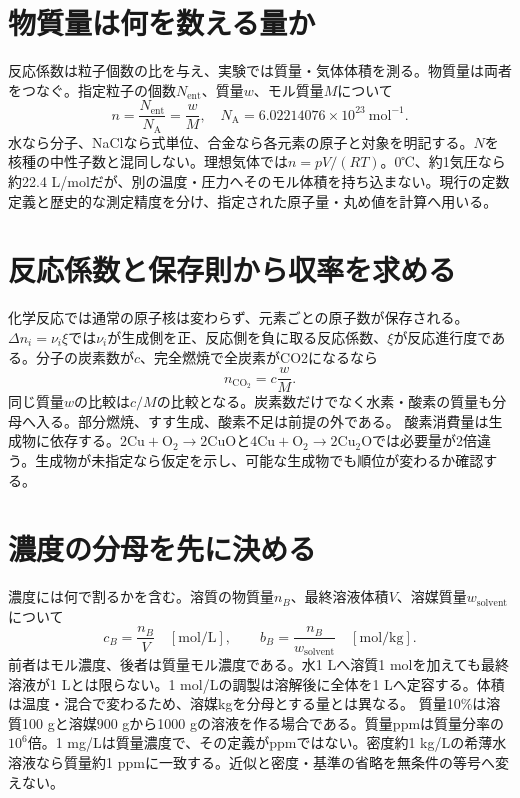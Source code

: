 \section{物質量は何を数える量か}
\label{theory:basicchem:amount}
反応係数は粒子個数の比を与え、実験では質量・気体体積を測る。物質量は両者をつなぐ。指定粒子の個数\(N_{\mathrm{ent}}\)、質量\(w\)、モル質量\(M\)について
\begin{equation}n=\frac{N_{\mathrm{ent}}}{N_{\mathrm A}}=\frac{w}{M},\quad N_{\mathrm A}=6.02214076\times10^{23}\ \mathrm{mol^{-1}}.\end{equation}
水なら分子、NaClなら式単位、合金なら各元素の原子と対象を明記する。\(N\)を核種の中性子数と混同しない。理想気体では\(n=pV/(RT)\)。0℃、約1気圧なら約22.4 L/molだが、別の温度・圧力へそのモル体積を持ち込まない。現行の定数定義と歴史的な測定精度を分け、指定された原子量・丸め値を計算へ用いる。

\section{反応係数と保存則から収率を求める}
\label{theory:basicchem:stoichiometry}
化学反応では通常の原子核は変わらず、元素ごとの原子数が保存される。\(\Delta n_i=\nu_i\xi\)では\(\nu_i\)が生成側を正、反応側を負に取る反応係数、\(\xi\)が反応進行度である。分子の炭素数が\(c\)、完全燃焼で全炭素がCO2になるなら
\begin{equation}n_{\mathrm{CO_2}}=c\frac{w}{M}.\end{equation}
同じ質量\(w\)の比較は\(c/M\)の比較となる。炭素数だけでなく水素・酸素の質量も分母へ入る。部分燃焼、すす生成、酸素不足は前提の外である。
酸素消費量は生成物に依存する。\(2\mathrm{Cu}+\mathrm{O_2}\to2\mathrm{CuO}\)と\(4\mathrm{Cu}+\mathrm{O_2}\to2\mathrm{Cu_2O}\)では必要量が2倍違う。生成物が未指定なら仮定を示し、可能な生成物でも順位が変わるか確認する。

\section{濃度の分母を先に決める}
\label{theory:basicchem:concentration}
濃度には何で割るかを含む。溶質の物質量\(n_B\)、最終溶液体積\(V\)、溶媒質量\(w_{\mathrm{solvent}}\)について
\begin{equation}c_B=\frac{n_B}{V}\quad[\mathrm{mol/L}],\qquad b_B=\frac{n_B}{w_{\mathrm{solvent}}}\quad[\mathrm{mol/kg}].\end{equation}
前者はモル濃度、後者は質量モル濃度である\autocite{iupac_amount_concentration,iupac_molality}。水1 Lへ溶質1 molを加えても最終溶液が1 Lとは限らない。1 mol/Lの調製は溶解後に全体を1 Lへ定容する。体積は温度・混合で変わるため、溶媒kgを分母とする量とは異なる。
質量10\%は溶質100 gと溶媒900 gから1000 gの溶液を作る場合である。質量ppmは質量分率の\(10^6\)倍。1 mg/Lは質量濃度で、その定義がppmではない。密度約1 kg/Lの希薄水溶液なら質量約1 ppmに一致する。近似と密度・基準の省略を無条件の等号へ変えない。


